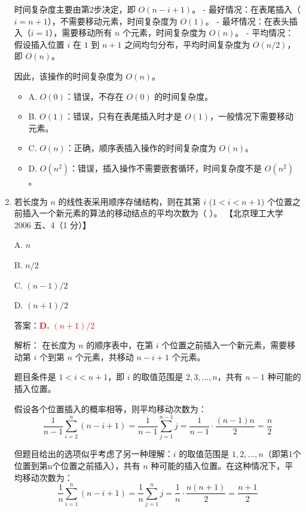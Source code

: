 \documentclass[lang=cn,newtx,10pt,scheme=chinese]{../../../elegantbook}
\begin{document}
\begin{enumerate}
        时间复杂度主要由第2步决定，即 $O(n-i+1)$。
        - 最好情况：在表尾插入（$i=n+1$），不需要移动元素，时间复杂度为 $O(1)$。
        - 最坏情况：在表头插入（$i=1$），需要移动所有 $n$ 个元素，时间复杂度为 $O(n)$。
        - 平均情况：假设插入位置 $i$ 在 $1$ 到 $n+1$ 之间均匀分布，平均时间复杂度为 $O(n/2)$，即 $O(n)$。

        因此，该操作的时间复杂度为 $O(n)$。

        \begin{itemize}
            \item A. $O(0)$：错误，不存在 $O(0)$ 的时间复杂度。
            \item B. $O(1)$：错误，只有在表尾插入时才是 $O(1)$，一般情况下需要移动元素。
            \item C. $O(n)$：正确，顺序表插入操作的时间复杂度为 $O(n)$。
            \item D. $O(n^2)$：错误，插入操作不需要嵌套循环，时间复杂度不是 $O(n^2)$。
        \end{itemize}
    
        \item 若长度为 $n$ 的线性表采用顺序存储结构，则在其第 $i$ ($1 < i < n+1$) 个位置之前插入一个新元素的算法的移动结点的平均次数为（ ）。  
        【北京理工大学 2006 五、4（1 分）】  
    
        A. $n$  
    
        B. $n/2$  
    
        C. $(n-1)/2$  
    
        D. $(n+1)/2$  

        答案：\textcolor{red}{\textbf{D.} $(n+1)/2$}

        解析：
        在长度为 $n$ 的顺序表中，在第 $i$ 个位置之前插入一个新元素，需要移动第 $i$ 个到第 $n$ 个元素，共移动 $n-i+1$ 个元素。

        题目条件是 $1 < i < n+1$，即 $i$ 的取值范围是 $2, 3, ..., n$，共有 $n-1$ 种可能的插入位置。

        假设各个位置插入的概率相等，则平均移动次数为：
        $$\frac{1}{n-1}\sum_{i=2}^{n}(n-i+1) = \frac{1}{n-1}\sum_{j=1}^{n-1}j = \frac{1}{n-1} \cdot \frac{(n-1)n}{2} = \frac{n}{2}$$

        但题目给出的选项似乎考虑了另一种理解：$i$ 的取值范围是 $1, 2, ..., n$（即第1个位置到第n个位置之前插入），共有 $n$ 种可能的插入位置。在这种情况下，平均移动次数为：
        $$\frac{1}{n}\sum_{i=1}^{n}(n-i+1) = \frac{1}{n}\sum_{j=1}^{n}j = \frac{1}{n} \cdot \frac{n(n+1)}{2} = \frac{n+1}{2}$$


\end{enumerate}
\end{document}
